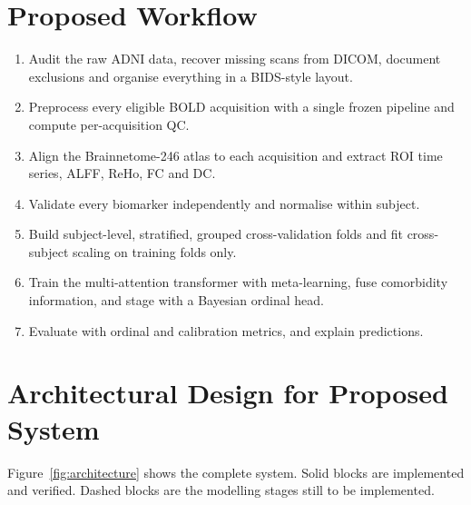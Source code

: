 \documentclass{ssnreview}
\begin{document}
\section{Proposed Workflow}
\begin{enumerate}[label=\textbf{Step \arabic*:}]
  \item Audit the raw ADNI data, recover missing scans from DICOM, document
        exclusions and organise everything in a BIDS-style layout.
  \item Preprocess every eligible BOLD acquisition with a single frozen
        pipeline and compute per-acquisition QC.
  \item Align the Brainnetome-246 atlas to each acquisition and extract ROI
        time series, ALFF, ReHo, FC and DC.
  \item Validate every biomarker independently and normalise within subject.
  \item Build subject-level, stratified, grouped cross-validation folds and
        fit cross-subject scaling on training folds only.
  \item Train the multi-attention transformer with meta-learning, fuse
        comorbidity information, and stage with a Bayesian ordinal head.
  \item Evaluate with ordinal and calibration metrics, and explain predictions.
\end{enumerate}

\section{Architectural Design for Proposed System}

Figure~\ref{fig:architecture} shows the complete system. Solid blocks are
implemented and verified. Dashed blocks are the modelling stages still to
be implemented.
\end{document}
